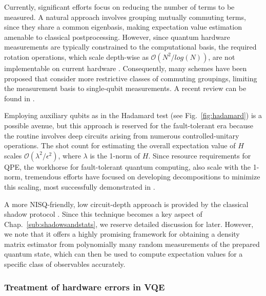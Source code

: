 \documentclass[../main.tex]{subfiles}
\begin{document}
Currently, significant efforts focus on reducing the number of terms to be measured. A natural approach involves grouping mutually commuting terms, since they share a common eigenbasis, making expectation value estimation amenable to classical postprocessing. However, since quantum hardware measurements are typically constrained to the computational basis, the required rotation operations, which scale depth-wise as $\mathcal{O}(N^2/ log(N))$, are not implementable on current hardware \cite{verteletskyi2020measurement}. Consequently, many schemes have been proposed that consider more restrictive classes of commuting groupings, limiting the measurement basis to single-qubit measurements. A recent review can be found in \cite{patel2025quantum}.

Employing auxiliary qubits as in the Hadamard test (see Fig.~\ref{fig:hadamard}) is a possible avenue, but this approach is reserved for the fault-tolerant era because the routine involves deep circuits arising from numerous controlled-unitary operations. The shot count for estimating the overall expectation value of $H$ scales $\mathcal{O}(\lambda^2/\epsilon^2)$, where $\lambda$ is the 1-norm of $H$. Since resource requirements for \ac{QPE}, the workhorse for fault-tolerant quantum computing, also scale with the 1-norm, tremendous efforts have focused on developing decompositions to minimize this scaling, most successfully demonstrated in \cite{oumarou2024accelerating, patel2025global}.

A more NISQ-friendly, low circuit-depth approach is provided by the classical shadow protocol  \cite{huang2020predicting}. Since this technique becomes a key aspect of Chap.~\ref{sub:shadowsandstats}, we reserve detailed discussion for later. However, we note that it offers a highly promising framework for obtaining a density matrix estimator from polynomially many random measurements of the prepared quantum state, which can then be used to compute expectation values for a specific class of observables accurately. 

\subsubsection{Treatment of hardware errors in VQE}
\end{document}
